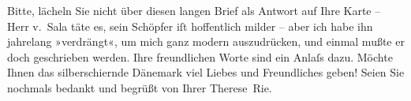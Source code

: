 \pstart
           Bitte, lächeln Sie nicht über diesen langen Brief als Antwort auf Ihre Karte – Herr v. Sala täte es, sein
               Schöpfer iſt hoffentlich milder – aber ich habe ihn jahrelang »verdrängt«, um mich
               ganz modern auszudrücken, und einmal mußte er doch geschrieben werden. Ihre
               freundlichen Worte sind ein Anlaſs dazu. Möchte Ihnen das silberschi{\geminationm}ernde Dänemark
               viel Liebes und Freundliches geben! Seien Sie nochmals bedankt und begrüßt von
               Ihrer\pend
           \pstart \spacefill\mbox{Therese Rie.}\pend{}\endnumbering{}  
      